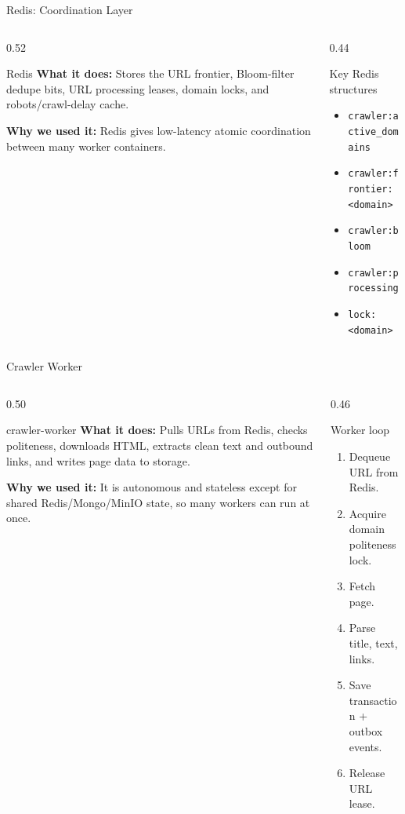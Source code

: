 \documentclass[aspectratio=169,11pt]{beamer}
\newcommand{\component}[3]{%
  \begin{block}{#1}
    \textbf{What it does:} #2

    \vspace{0.35em}
    \textbf{Why we used it:} #3
  \end{block}
}
\begin{document}
\begin{frame}{Redis: Coordination Layer}
  \begin{columns}[T,totalwidth=\textwidth]
    \begin{column}{0.52\textwidth}
      \component{Redis}
      {Stores the URL frontier, Bloom-filter dedupe bits, URL processing leases, domain locks, and robots/crawl-delay cache.}
      {Redis gives low-latency atomic coordination between many worker containers.}
    \end{column}
    \begin{column}{0.44\textwidth}
      \begin{block}{Key Redis structures}
        \begin{itemize}
          \item \texttt{crawler:active\_domains}
          \item \texttt{crawler:frontier:<domain>}
          \item \texttt{crawler:bloom}
          \item \texttt{crawler:processing}
          \item \texttt{lock:<domain>}
        \end{itemize}
      \end{block}
    \end{column}
  \end{columns}
\end{frame}

\begin{frame}{Crawler Worker}
  \begin{columns}[T,totalwidth=\textwidth]
    \begin{column}{0.50\textwidth}
      \component{crawler-worker}
      {Pulls URLs from Redis, checks politeness, downloads HTML, extracts clean text and outbound links, and writes page data to storage.}
      {It is autonomous and stateless except for shared Redis/Mongo/MinIO state, so many workers can run at once.}
    \end{column}
    \begin{column}{0.46\textwidth}
      \begin{block}{Worker loop}
        \begin{enumerate}
          \item Dequeue URL from Redis.
          \item Acquire domain politeness lock.
          \item Fetch page.
          \item Parse title, text, links.
          \item Save transaction + outbox events.
          \item Release URL lease.
        \end{enumerate}
      \end{block}
    \end{column}
  \end{columns}
\end{frame}
\end{document}
